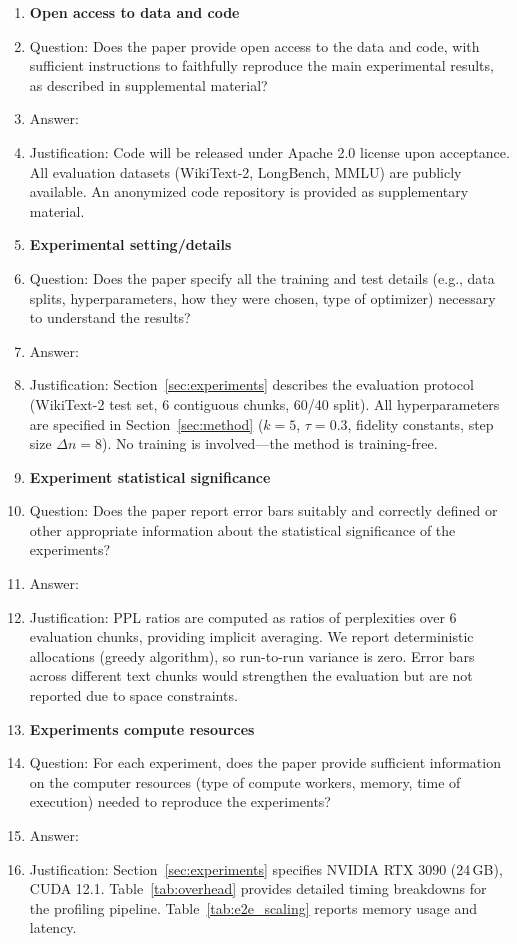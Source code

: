 \begin{enumerate}
\item {\bf Open access to data and code}
    \item[] Question: Does the paper provide open access to the data and code, with sufficient instructions to faithfully reproduce the main experimental results, as described in supplemental material?
    \item[] Answer: \answerYes{}
    \item[] Justification: Code will be released under Apache 2.0 license upon acceptance. All evaluation datasets (WikiText-2, LongBench, MMLU) are publicly available. An anonymized code repository is provided as supplementary material.

\item {\bf Experimental setting/details}
    \item[] Question: Does the paper specify all the training and test details (e.g., data splits, hyperparameters, how they were chosen, type of optimizer) necessary to understand the results?
    \item[] Answer: \answerYes{}
    \item[] Justification: Section~\ref{sec:experiments} describes the evaluation protocol (WikiText-2 test set, 6 contiguous chunks, 60/40 split). All hyperparameters are specified in Section~\ref{sec:method} ($k=5$, $\tau=0.3$, fidelity constants, step size $\Delta n=8$). No training is involved---the method is training-free.

\item {\bf Experiment statistical significance}
    \item[] Question: Does the paper report error bars suitably and correctly defined or other appropriate information about the statistical significance of the experiments?
    \item[] Answer: \answerNo{}
    \item[] Justification: PPL ratios are computed as ratios of perplexities over 6 evaluation chunks, providing implicit averaging. We report deterministic allocations (greedy algorithm), so run-to-run variance is zero. Error bars across different text chunks would strengthen the evaluation but are not reported due to space constraints.

\item {\bf Experiments compute resources}
    \item[] Question: For each experiment, does the paper provide sufficient information on the computer resources (type of compute workers, memory, time of execution) needed to reproduce the experiments?
    \item[] Answer: \answerYes{}
    \item[] Justification: Section~\ref{sec:experiments} specifies NVIDIA RTX 3090 (24\,GB), CUDA 12.1. Table~\ref{tab:overhead} provides detailed timing breakdowns for the profiling pipeline. Table~\ref{tab:e2e_scaling} reports memory usage and latency.


\end{enumerate}
